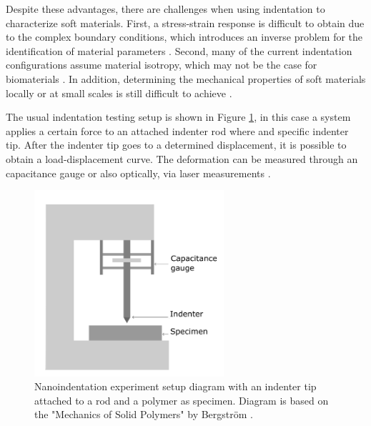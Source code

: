 Despite these advantages, there are challenges when using indentation to 
characterize soft materials. First, a stress-strain response is difficult to
obtain due to the complex boundary conditions, which introduces an inverse problem 
for the identification of material parameters \cite{Shi2019}. Second, many of the current 
indentation configurations assume material isotropy, which may not be the case for biomaterials \cite{Feng2017}.
In addition, determining the mechanical properties of soft materials locally or at small scales is still difficult to achieve \cite{Zhang2014}.


The usual indentation testing setup is shown in Figure \ref{fig:Nanoindentation}, in this case a 
system applies a certain force to an attached indenter rod where and specific 
indenter tip. After the indenter tip goes to a determined displacement, 
it is possible to obtain a load-displacement curve.
The deformation can be measured through an capacitance gauge or also optically, via laser measurements \cite{Bergström2015}.\\

\begin{figure}[th]
        \centering
        \includegraphics[width=7cm]{Images/nanoindentationbigletter}
        \caption[Nanoindentation experiment diagram]{Nanoindentation experiment setup diagram with an indenter tip attached to a rod and a polymer as specimen. Diagram is based on the "Mechanics of Solid Polymers" by Bergström \cite{Bergström2015}.}
        \label{fig:Nanoindentation}
\end{figure}


